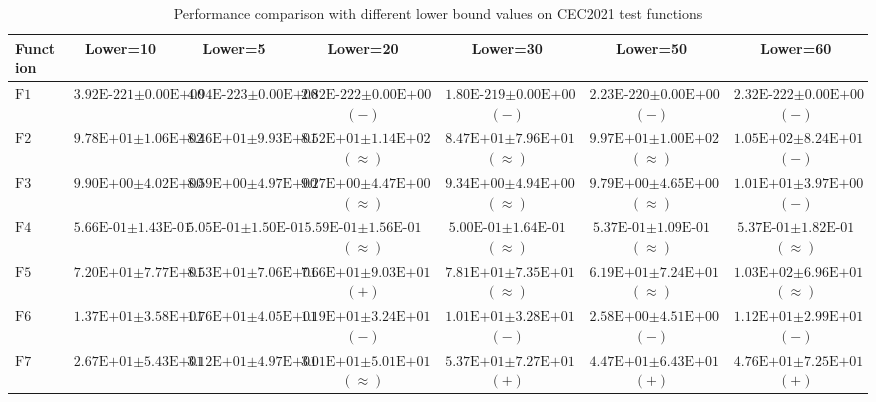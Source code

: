 \begin{table}[htbp]
\centering
\caption{Performance comparison with different lower bound values on CEC2021 test functions}
\label{tab:lowerbound-comparison}
\begingroup
\scriptsize
\setlength{\tabcolsep}{2pt}
\renewcommand{\arraystretch}{1.05}
\begin{tabular}{lcccccc}
\toprule
Function & Lower=10 & Lower=5 & Lower=20 & Lower=30 & Lower=50 & Lower=60 \\
\midrule
$\text{F1}$ & $\text{3.92E-221}\pm\text{0.00E+00}$ & $\text{4.94E-223}\pm\text{0.00E+00}$ & $\text{2.82E-222}\pm\text{0.00E+00}$ $(-)$ & $\text{1.80E-219}\pm\text{0.00E+00}$ $(-)$ & $\text{2.23E-220}\pm\text{0.00E+00}$ $(-)$ & $\text{2.32E-222}\pm\text{0.00E+00}$ $(-)$ \\
$\text{F2}$ & $\text{9.78E+01}\pm\text{1.06E+02}$ & $\text{8.46E+01}\pm\text{9.93E+01}$ & $\text{8.52E+01}\pm\text{1.14E+02}$ $(\approx)$ & $\text{8.47E+01}\pm\text{7.96E+01}$ $(\approx)$ & $\text{9.97E+01}\pm\text{1.00E+02}$ $(\approx)$ & $\text{1.05E+02}\pm\text{8.24E+01}$ $(-)$ \\
$\text{F3}$ & $\text{9.90E+00}\pm\text{4.02E+00}$ & $\text{8.59E+00}\pm\text{4.97E+00}$ & $\text{9.27E+00}\pm\text{4.47E+00}$ $(\approx)$ & $\text{9.34E+00}\pm\text{4.94E+00}$ $(\approx)$ & $\text{9.79E+00}\pm\text{4.65E+00}$ $(\approx)$ & $\text{1.01E+01}\pm\text{3.97E+00}$ $(-)$ \\
$\text{F4}$ & $\text{5.66E-01}\pm\text{1.43E-01}$ & $\text{5.05E-01}\pm\text{1.50E-01}$ & $\text{5.59E-01}\pm\text{1.56E-01}$ $(\approx)$ & $\text{5.00E-01}\pm\text{1.64E-01}$ $(\approx)$ & $\text{5.37E-01}\pm\text{1.09E-01}$ $(\approx)$ & $\text{5.37E-01}\pm\text{1.82E-01}$ $(\approx)$ \\
$\text{F5}$ & $\text{7.20E+01}\pm\text{7.77E+01}$ & $\text{8.53E+01}\pm\text{7.06E+01}$ & $\text{7.66E+01}\pm\text{9.03E+01}$ $(+)$ & $\text{7.81E+01}\pm\text{7.35E+01}$ $(\approx)$ & $\text{6.19E+01}\pm\text{7.24E+01}$ $(\approx)$ & $\text{1.03E+02}\pm\text{6.96E+01}$ $(\approx)$ \\
$\text{F6}$ & $\text{1.37E+01}\pm\text{3.58E+01}$ & $\text{1.76E+01}\pm\text{4.05E+01}$ & $\text{1.19E+01}\pm\text{3.24E+01}$ $(-)$ & $\text{1.01E+01}\pm\text{3.28E+01}$ $(-)$ & $\text{2.58E+00}\pm\text{4.51E+00}$ $(-)$ & $\text{1.12E+01}\pm\text{2.99E+01}$ $(-)$ \\
$\text{F7}$ & $\text{2.67E+01}\pm\text{5.43E+01}$ & $\text{3.12E+01}\pm\text{4.97E+01}$ & $\text{3.01E+01}\pm\text{5.01E+01}$ $(\approx)$ & $\text{5.37E+01}\pm\text{7.27E+01}$ $(+)$ & $\text{4.47E+01}\pm\text{6.43E+01}$ $(+)$ & $\text{4.76E+01}\pm\text{7.25E+01}$ $(+)$ \\

\end{tabular}
\end{table}
